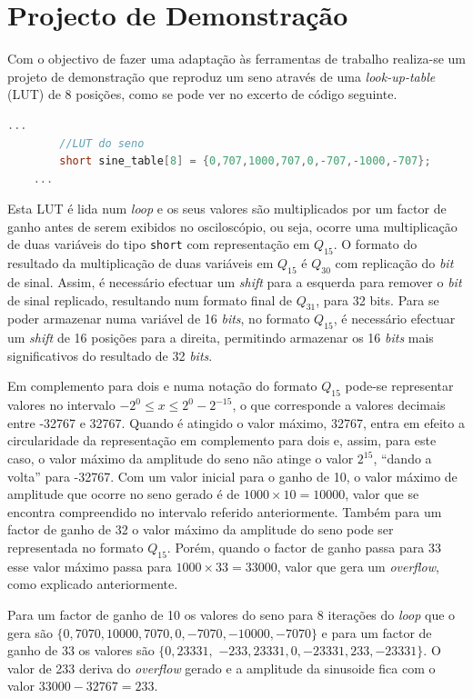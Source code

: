 \documentclass[11pt]{article}
\numberwithin{equation}{section}
\begin{document}
\pagebreak

\section{Projecto de Demonstração}

Com o objectivo de fazer uma adaptação às ferramentas de trabalho realiza-se um projeto de demonstração que reproduz um seno através de uma \textit{look-up-table} (LUT) de 8 posições, como se pode ver no excerto de código seguinte.

\begin{lstlisting}[language=C]
	...
		//LUT do seno
		short sine_table[8] = {0,707,1000,707,0,-707,-1000,-707}; 
	...
\end{lstlisting}

Esta LUT é lida num \textit{loop} e os seus valores são multiplicados por um factor de ganho antes de serem exibidos no osciloscópio, ou seja, ocorre uma multiplicação de duas variáveis do tipo \texttt{short} com representação em $Q_{15}$. O formato do resultado da multiplicação de duas variáveis em $Q_{15}$ é $Q_{30}$ com replicação do \textit{bit} de sinal. Assim, é necessário efectuar um \textit{shift} para a esquerda para remover o \textit{bit} de sinal replicado, resultando num formato final de $Q_{31}$, para 32 bits. Para se poder armazenar numa variável de 16 \textit{bits}, no formato $Q_{15}$, é necessário efectuar um \textit{shift} de 16 posições para a direita, permitindo armazenar os 16 \textit{bits} mais significativos do resultado de 32 \textit{bits}. 

Em complemento para dois e numa notação do formato $Q_{15}$ pode-se representar valores no intervalo $-2^{0} \leq x \leq 2^{0} - 2^{-15}$, o que corresponde a valores decimais entre -32767 e 32767. Quando é atingido o valor máximo, 32767, entra em efeito a circularidade da representação em complemento para dois e, assim, para este caso, o valor máximo da amplitude do seno não atinge o valor $2^{15}$, ``dando a volta'' para -32767. 
Com um valor inicial para o ganho de 10, o valor máximo de amplitude que ocorre no seno gerado é de $1000 \times 10 = 10000$, valor que se encontra compreendido no intervalo referido anteriormente. Também para um factor de ganho de 32 o valor máximo da amplitude do seno pode ser representada no formato $Q_{15}$. Porém, quando o factor de ganho passa para 33 esse valor máximo passa para $1000 \times 33 = 33000$, valor que gera um \textit{overflow}, como explicado anteriormente.

Para um factor de ganho de 10 os valores do seno para 8 iterações do \textit{loop} que o gera são $\{0,7070,10000,7070,0,-7070,-10000,-7070\}$ e para um factor de ganho de 33 os valores são $\{0,23331,$ \linebreak $-233,23331,0,-23331,233,-23331\}$. O valor de 233 deriva do \textit{overflow} gerado e a amplitude da sinusoide fica com o valor $33000 - 32767 = 233$.
\end{document}
